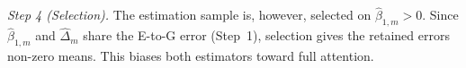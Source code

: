 \emph{Step 4 (Selection).} The estimation sample is, however, selected on $\hat\beta_{1,m}>0$. Since $\hat\beta_{1,m}$ and $\hat\Delta_m$ share the E-to-G error (Step~1), selection gives the retained errors non-zero means. This biases both estimators toward full attention.
